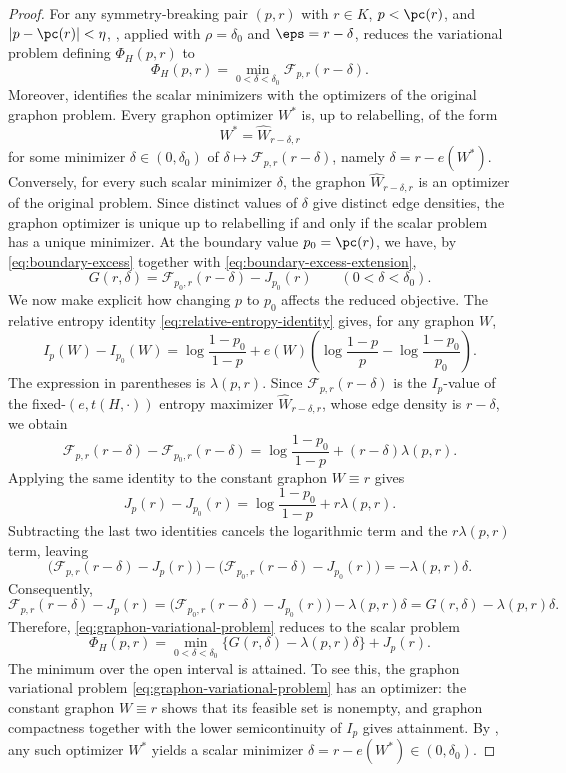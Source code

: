 \begin{proof}
For any symmetry-breaking pair $(p,r)$ with $r\in K$, $p<\pc(r)$, and
$|p-\pc(r)|<\eta$, , applied with
$\rho=\delta_0$ and $\eps=r-\delta$, reduces the variational problem defining
$\Phi_H(p,r)$ to
\[
  \Phi_H(p,r)
  =
  \min_{0<\delta<\delta_0}
  \mathcal F_{p,r}(r-\delta).
\]
Moreover,  identifies the scalar
minimizers with the optimizers of the original graphon problem.  Every graphon
optimizer \(W^*\) is, up to relabelling, of the form
\[
  W^*=\widehat W_{r-\delta,r}
\]
for some minimizer \(\delta\in(0,\delta_0)\) of
\(\delta\mapsto\mathcal F_{p,r}(r-\delta)\), namely
\(\delta=r-e(W^*)\).  Conversely, for every such scalar minimizer \(\delta\),
the graphon \(\widehat W_{r-\delta,r}\) is an optimizer of the original
problem.  Since distinct values of \(\delta\) give distinct edge densities,
the graphon optimizer is unique up to relabelling if and only if the scalar
problem has a unique minimizer.
At the boundary value $p_0=\pc(r)$, we have, by \eqref{eq:boundary-excess} together
with \eqref{eq:boundary-excess-extension},
\[
  G(r,\delta)
  =
  \mathcal F_{p_0,r}(r-\delta)-J_{p_0}(r)
  \qquad(0<\delta<\delta_0).
\]
We now make explicit how changing \(p\) to \(p_0\) affects the reduced
objective.  The relative entropy identity
\eqref{eq:relative-entropy-identity} gives, for any graphon \(W\),
\[
  I_p(W)-I_{p_0}(W)
  =
  \log\frac{1-p_0}{1-p}
  +e(W)\left(
    \log\frac{1-p}{p}-\log\frac{1-p_0}{p_0}
  \right).
\]
The expression in parentheses is \(\lambda(p,r)\).  Since
\(\mathcal F_{p,r}(r-\delta)\) is the \(I_p\)-value of the fixed-$(e,t(H,\cdot))$
entropy maximizer \(\widehat W_{r-\delta,r}\), whose edge density is \(r-\delta\),
we obtain
\[
  \mathcal F_{p,r}(r-\delta)
  -\mathcal F_{p_0,r}(r-\delta)
  =
  \log\frac{1-p_0}{1-p}
  +(r-\delta)\lambda(p,r).
\]
Applying the same identity to the constant graphon \(W\equiv r\) gives
\[
  J_p(r)-J_{p_0}(r)
  =
  \log\frac{1-p_0}{1-p}
  +r\lambda(p,r).
\]
Subtracting the last two identities cancels the logarithmic term and the
\(r\lambda(p,r)\) term, leaving
\[
  \bigl(\mathcal F_{p,r}(r-\delta)-J_p(r)\bigr)
  -\bigl(\mathcal F_{p_0,r}(r-\delta)-J_{p_0}(r)\bigr)
  =-\lambda(p,r)\delta.
\]
Consequently,
\[
  \mathcal F_{p,r}(r-\delta)-J_p(r)
  =
  \bigl(\mathcal F_{p_0,r}(r-\delta)-J_{p_0}(r)\bigr)
  -\lambda(p,r)\delta
  =
  G(r,\delta)-\lambda(p,r)\delta.
\]
Therefore, \eqref{eq:graphon-variational-problem} reduces to the scalar problem
\begin{equation}\label{eq:edge-deficit-minimization}
  \Phi_H(p,r)
  =\min_{0<\delta<\delta_0}
  \{G(r,\delta)-\lambda(p,r)\delta\}
  + J_p(r).
\end{equation}
The minimum over the open interval is attained.  To see this, the graphon
variational problem \eqref{eq:graphon-variational-problem} has an optimizer: the
constant graphon $W\equiv r$ shows that its feasible set is nonempty, and
graphon compactness together with the lower semicontinuity of $I_p$ gives
attainment.  By , any such optimizer
$W^*$ yields a scalar minimizer
$\delta=r-e(W^*)\in(0,\delta_0)$.


\end{proof}
